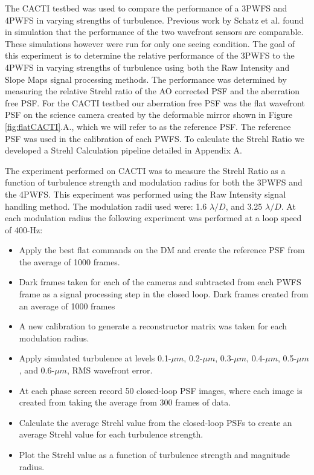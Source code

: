 The CACTI testbed was used to compare the performance of a 3PWFS and 4PWFS in varying strengths of turbulence. Previous work by Schatz et al. found in simulation that the performance of the two wavefront sensors are comparable. These simulations however were run for only one seeing condition. The goal of this experiment is to determine the relative performance of the 3PWFS to the 4PWFS in varying strengths of turbulence using both the Raw Intensity and Slope Maps signal processing methods. The performance was determined by measuring the relative Strehl ratio of the AO corrected PSF and the aberration free PSF. For the CACTI testbed our aberration free PSF was the flat wavefront PSF on the science camera created by the deformable mirror shown in Figure \ref{fig:flatCACTI}.A., which we will refer to as the reference PSF. The reference PSF was used in the calibration of each PWFS. To calculate the Strehl Ratio we developed a Strehl Calculation pipeline detailed in Appendix A.

The experiment performed on CACTI was to measure the Strehl Ratio as a function of turbulence strength and modulation radius for both the 3PWFS and the 4PWFS.  This experiment was performed using the Raw Intensity signal handling method. The modulation radii used were: 1.6 $\lambda/D$, and 3.25 $\lambda/D$. At each modulation radius the following experiment was performed at a loop speed of 400-Hz:

\begin{itemize}
    \item Apply the best flat commands on the DM and create the reference PSF from the average of 1000 frames.
    \item Dark frames taken for each of the cameras and subtracted from each PWFS frame as a signal processing step in the closed loop. Dark frames created from an average of 1000 frames
    \item A new calibration to generate a reconstructor matrix was taken for each modulation radius.
    \item Apply simulated turbulence at levels 0.1-$\mu m$, 0.2-$\mu m$, 0.3-$\mu m$, 0.4-$\mu m$, 0.5-$\mu m$, and 0.6-$\mu m$, RMS wavefront error. 
    \item At each phase screen record 50 closed-loop PSF images, where each image is created from taking the average from 300 frames of data. 
    \item Calculate the average Strehl value from the closed-loop PSFs to create an average Strehl value for each turbulence strength.
    \item Plot the Strehl value as a function of turbulence strength and magnitude radius. 
    
\end{itemize}

